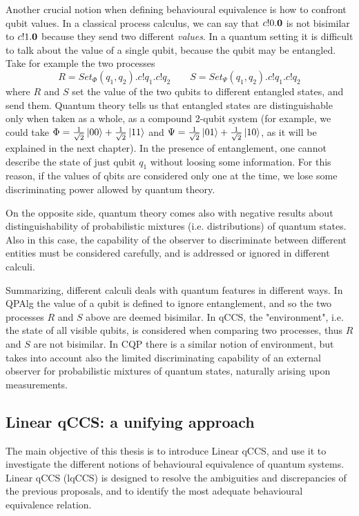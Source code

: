  Another crucial notion when defining behavioural equivalence is how to confront qubit values. In a classical process calculus, we can say that $c!0.\mathbf{0}$ is not bisimilar to $c!1.\mathbf{0}$ because they send two different \textit{values}. In a quantum setting it is difficult to talk about the value of a single qubit, because the qubit may be entangled.  Take for example the two processes 
 \[R = Set_{\Phi}(q_1, q_2).c!q_1.c!q_2 \qquad 
   S = Set_{\Psi}(q_1, q_2).c!q_1.c!q_2\]
where $R$ and $S$ set the value of the two qubits to different entangled states, and send them.
Quantum theory tells us that entangled states are distinguishable only when taken as a whole, as a compound 2-qubit system (for example, we could take $\Phi = \frac{1}{\sqrt{2}}\ket{00} + \frac{1}{\sqrt{2}}\ket{11}$ and $\Psi = \frac{1}{\sqrt{2}}\ket{01} + \frac{1}{\sqrt{2}}\ket{10}$, as it will be explained in the next chapter). In the presence of entanglement, one cannot describe the state of just qubit $q_1$ without loosing some information. For this reason, if the values of qbits are considered only one at the time, we lose some discriminating power allowed by quantum theory.

On the opposite side, quantum theory comes also with negative results about distinguishability of probabilistic mixtures (i.e. distributions) of quantum states. Also in this case, the capability of the observer to discriminate between different entities must be considered carefully, and is addressed or ignored in different calculi.
 
Summarizing, different calculi deals with quantum features in different ways. In QPAlg the value of a qubit is defined to ignore entanglement, and so the two processes $R$ and $S$ above are deemed bisimilar. In qCCS, the "environment", i.e. the state of all visible qubits, is considered when comparing two processes, thus $R$ and $S$ are not bisimilar. In CQP there is a similar notion of environment, but takes into account also the limited discriminating capability of an external observer for probabilistic mixtures of quantum states, naturally arising upon measurements.
 
\subsection*{Linear qCCS: a unifying approach}
The main objective of this thesis is to introduce Linear qCCS, and use it to investigate the different notions of behavioural equivalence of quantum systems. Linear qCCS (lqCCS) is designed to resolve the ambiguities and discrepancies of the previous proposals, and to identify the most adequate behavioural equivalence relation.

